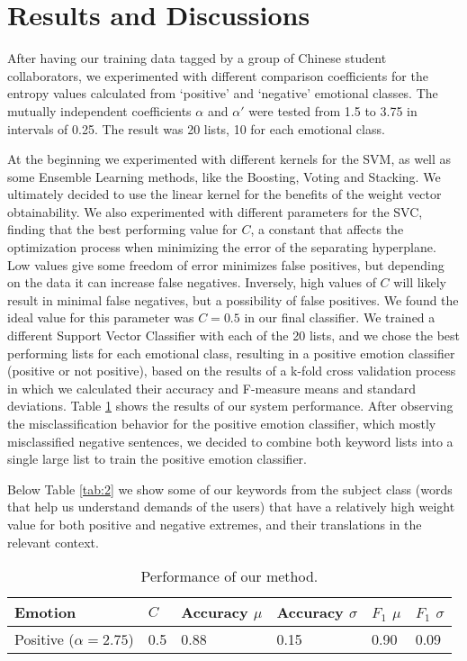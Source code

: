 \documentclass[review]{elsarticle}
\begin{document}
\section{Results and Discussions}

After having our training data tagged by a group of Chinese student collaborators, we experimented with different comparison coefficients for the entropy values calculated from ‘positive’ and ‘negative’ emotional classes. The mutually independent coefficients \(\alpha\) and \(\alpha'\) were tested from 1.5 to 3.75 in intervals of 0.25. The result was 20 lists, 10 for each emotional class.  

At the beginning we experimented with different kernels for the SVM, as well as some Ensemble Learning methods, like the Boosting, Voting and Stacking. We ultimately decided to use the linear kernel for the benefits of the weight vector obtainability. We also experimented with different parameters for the SVC, finding that the best performing value for \(C\), a constant that affects the optimization process when minimizing the error of the separating hyperplane. Low values give some freedom of error minimizes false positives, but depending on the data it can increase false negatives. Inversely, high values of \(C\) will likely result in minimal false negatives, but a possibility of false positives. We found the ideal value for this parameter was \(C=0.5\) in our final classifier. We trained a different Support Vector Classifier with each of the 20 lists, and we chose the best performing lists for each emotional class, resulting in a positive emotion classifier (positive or not positive), based on the results of a k-fold cross validation process in which we calculated their accuracy and F-measure means and standard deviations. Table \ref{tab:1} shows the results of our system performance. After observing the misclassification behavior for the positive emotion classifier, which mostly misclassified negative sentences, we decided to combine both keyword lists into a single large list to train the positive emotion classifier. 

Below Table \ref{tab:2} we show some of our keywords from the subject class (words that help us understand demands of the users) that have a relatively high weight value for both positive and negative extremes, and their translations in the relevant context.

\begin{table}[]
\centering
\caption{Performance of our method.}
\label{tab:1}
\begin{tabular}{|l|l|l|l|l|l|} 
\hline
Emotion & \(C\) & Accuracy \(\mu\) & Accuracy \(\sigma\) & \(F_{1}\) \(\mu\) & \(F_{1}\) \( \sigma\) \\ \hline
Positive (\(\alpha=2.75\)) & 0.5 & 0.88 & 0.15 & 0.90 & 0.09 \\ \hline
\end{tabular}
\end{table}
\end{document}
